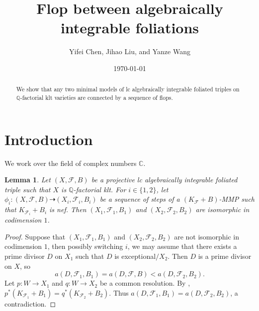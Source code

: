 \documentclass[11pt]{amsart}
\numberwithin{equation}{section}
\newcommand{\Qq}{\mathbb{Q}}
\newcommand{\Ff}{\mathcal{F}}
\newtheorem{lem}[thm]{Lemma}
\theoremstyle{definition}
\theoremstyle{definition}
\theoremstyle{definition}
\begin{document}
\title{Flop between algebraically integrable foliations}
\author{Yifei Chen, Jihao Liu, and Yanze Wang}

\date{\today}

\begin{abstract}
We show that any two minimal models of lc algebraically integrable foliated triples on $\Qq$-factorial klt varieties are connected by a sequence of flops.
\end{abstract}

\address{Department of Mathematics, Northwestern University, 2033 Sheridan Road, Evanston, IL 60208, USA}



\maketitle

\pagestyle{myheadings}

\tableofcontents


\section{Introduction}\label{sec:Introduction}
We work over the field of complex numbers $\mathbb C$. 

\begin{lem}\label{lem: minimal model iso in codimension 1}
Let $(X,\Ff,B)$ be a projective lc algebraically integrable foliated triple such that $X$ is $\Qq$-factorial klt. For $i\in\{1,2\}$, let $\phi_i: (X,\Ff,B)\dashrightarrow (X_i,\Ff_i,B_i)$ be a sequence of steps of a $(K_{\Ff}+B)$-MMP such that $K_{\Ff_i}+B_i$ is nef. Then $(X_1,\Ff_1,B_1)$ and $(X_2,\Ff_2,B_2)$ are isomorphic in codimension $1$.
\end{lem}
\begin{proof}
Suppose that $(X_1,\Ff_1,B_1)$ and $(X_2,\Ff_2,B_2)$ are not isomorphic in codimension $1$, then possibly switching $i$, we may assume that there exists a prime divisor $D$ on $X_1$ such that $D$ is exceptional$/X_2$. Then $D$ is a prime divisor on $X$, so
$$a(D,\Ff_1,B_1)=a(D,\Ff,B)<a(D,\Ff_2,B_2).$$
Let $p: W\rightarrow X_1$ and $q: W\rightarrow X_2$ be a common resolution.  By \cite[Lemma 4.7]{LMX24}, $p^*(K_{\Ff_1}+B_1)=q^*(K_{\Ff_2}+B_2)$. Thus $a(D,\Ff_1,B_1)=a(D,\Ff_2,B_2)$, a contradiction.
\end{proof}
\end{document}
